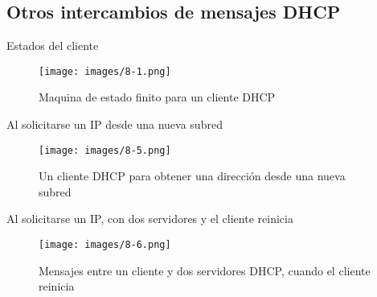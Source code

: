 \subsection{Otros intercambios de mensajes DHCP} %


    \begin{frame}{Estados del cliente}

    \begin{figure}
    \begin{center}

    \texttt{[image: images/8-1.png]}
    \caption{Maquina de estado finito para un cliente DHCP}
    \label{States-1}

    \end{center}
    \end{figure}

    \end{frame}


    \begin{frame}{Al solicitarse un IP desde una nueva subred}
    \begin{figure}
    \begin{center}

    \texttt{[image: images/8-5.png]}
    \caption{Un cliente DHCP para obtener una dirección desde una nueva subred}
    \label{States-2}

    \end{center}
    \end{figure}
    \end{frame}

    \begin{frame}{Al solicitarse un IP, con dos servidores y el cliente reinicia}
    \begin{figure}
    \begin{center}

    \texttt{[image: images/8-6.png]}
    \caption{Mensajes entre un cliente y dos servidores DHCP, cuando el cliente reinicia}
    \label{States-3}

    \end{center}
    \end{figure}
    \end{frame}


